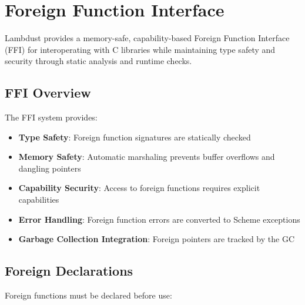 \chapter{Foreign Function Interface}
\label{ch:ffi}

Lambdust provides a memory-safe, capability-based Foreign Function Interface (FFI) for interoperating with C libraries while maintaining type safety and security through static analysis and runtime checks.

\section{FFI Overview}
\label{sec:ffi-overview}

The FFI system provides:

\begin{itemize}
\item \textbf{Type Safety}: Foreign function signatures are statically checked
\item \textbf{Memory Safety}: Automatic marshaling prevents buffer overflows and dangling pointers  
\item \textbf{Capability Security}: Access to foreign functions requires explicit capabilities
\item \textbf{Error Handling}: Foreign function errors are converted to Scheme exceptions
\item \textbf{Garbage Collection Integration}: Foreign pointers are tracked by the GC
\end{itemize}

\section{Foreign Declarations}
\label{sec:foreign-declarations}


Foreign functions must be declared before use:

\begin{grammar}
\\
\\
\end{grammar}

